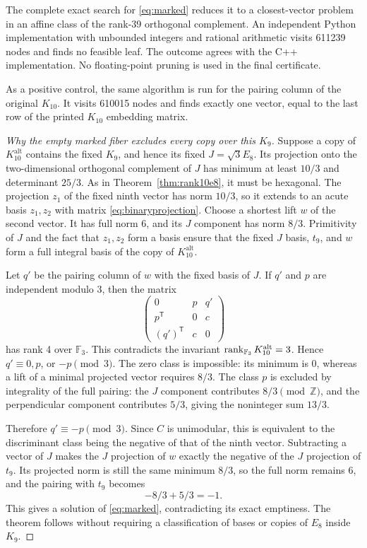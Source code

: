 \documentclass[11pt,a4paper]{article}
\theoremstyle{remark}\newtheorem{remark}[theorem]{Remark}
\newcommand{\Z}{\mathbb Z}\newcommand{\R}{\mathbb R}\newcommand{\F}{\mathbb F}
\newcommand{\Kalt}{K_{10}^{\mathrm{alt}}}
\begin{document}
The complete exact search for \eqref{eq:marked} reduces it to a closest-vector problem in an affine class of the rank-39 orthogonal complement. An independent Python implementation with unbounded integers and rational arithmetic visits 611239 nodes and finds no feasible leaf. The outcome agrees with the C++ implementation. No floating-point pruning is used in the final certificate.

As a positive control, the same algorithm is run for the pairing column of the original $K_{10}$. It visits 610015 nodes and finds exactly one vector, equal to the last row of the printed $K_{10}$ embedding matrix.

\begin{proof}[Why the empty marked fiber excludes every copy over this $K_9$]
Suppose a copy of $\Kalt$ contains the fixed $K_9$, and hence its fixed $J=\sqrt3E_8$. Its projection onto the two-dimensional orthogonal complement of $J$ has minimum at least $10/3$ and determinant $25/3$. As in Theorem~\ref{thm:rank10e8}, it must be hexagonal. The projection $z_1$ of the fixed ninth vector has norm $10/3$, so it extends to an acute basis $z_1,z_2$ with matrix \eqref{eq:binaryprojection}. Choose a shortest lift $w$ of the second vector. It has full norm 6, and its $J$ component has norm $8/3$. Primitivity of $J$ and the fact that $z_1,z_2$ form a basis ensure that the fixed $J$ basis, $t_9$, and $w$ form a full integral basis of the copy of $\Kalt$.

Let $q'$ be the pairing column of $w$ with the fixed basis of $J$. If $q'$ and $p$ are independent modulo 3, then the matrix
\[
\begin{pmatrix}0&p&q'\\p^{\mathsf T}&0&c\\(q')^{\mathsf T}&c&0\end{pmatrix}
\]
has rank 4 over $\F_3$. This contradicts the invariant $\rank_{\F_3}\Kalt=3$. Hence $q'\equiv0,p$, or $-p\pmod3$. The zero class is impossible: its minimum is 0, whereas a lift of a minimal projected vector requires $8/3$. The class $p$ is excluded by integrality of the full pairing: the $J$ component contributes $8/3\pmod\Z$, and the perpendicular component contributes $5/3$, giving the noninteger sum $13/3$.

Therefore $q'\equiv-p\pmod3$. Since $C$ is unimodular, this is equivalent to the discriminant class being the negative of that of the ninth vector. Subtracting a vector of $J$ makes the $J$ projection of $w$ exactly the negative of the $J$ projection of $t_9$. Its projected norm is still the same minimum $8/3$, so the full norm remains 6, and the pairing with $t_9$ becomes
\[
-8/3+5/3=-1.
\]
This gives a solution of \eqref{eq:marked}, contradicting its exact emptiness. The theorem follows without requiring a classification of bases or copies of $E_8$ inside $K_9$.
\end{proof}
\end{document}

